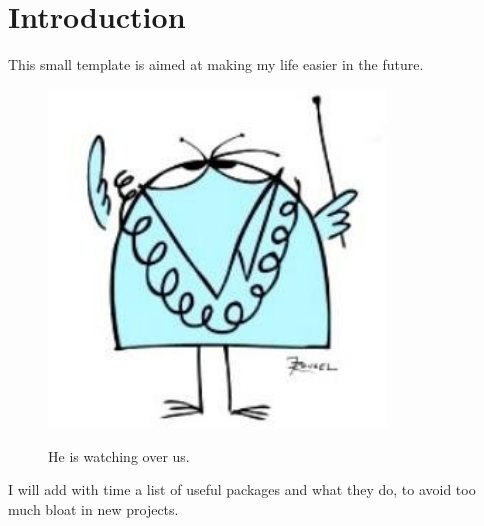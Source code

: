 \section{Introduction}
    This small template is aimed at making my life easier in the future.

    \begin{figure}[h]
        \centering
        \includegraphics[width=0.8\textwidth]{figure/intro/shadoko}
        \label{fig:intro:shadoko}
        \caption{He is watching over us.\cite{denis2012de}}
    \end{figure}

    I will add with time a list of useful packages and what they do, to avoid too much bloat in new projects.